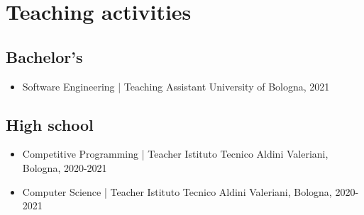 \documentclass[10pt, a4paper]{extarticle}
\begin{document}
  \section*{Teaching activities}


  \subsection*{Bachelor's}
  \begin{itemize}

    \item Software Engineering | Teaching Assistant \hfill University of Bologna, 2021

  \end{itemize}

  \subsection*{High school}
  \begin{itemize}

    \item Competitive Programming | Teacher \hfill Istituto Tecnico Aldini Valeriani, Bologna, 2020-2021

    \item Computer Science | Teacher \hfill  Istituto Tecnico Aldini Valeriani, Bologna, 2020-2021
  \end{itemize}
  \nocite{*}
  
\end{document}
